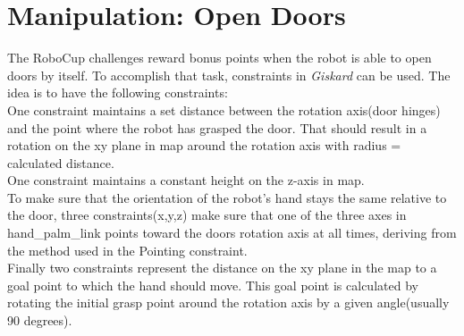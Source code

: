 \documentclass[main.tex]{subfiles}
\begin{document}
		\section{Manipulation: Open Doors}
		The RoboCup challenges reward bonus points when the robot is able to open doors by itself. To accomplish that task, constraints in \textit{Giskard} can be used. The idea is to have the following constraints:\\
		One constraint maintains a set distance between the rotation axis(door hinges) and the point where the robot has grasped the door. That should result in a rotation on the xy plane in map around the rotation axis with radius = calculated distance.\\
		One constraint maintains a constant height on the z-axis in map.\\
		To make sure that the orientation of the robot's hand stays the same relative to the door, three constraints(x,y,z) make sure that one of the three axes in hand\_palm\_link points toward the doors rotation axis at all times, deriving from the method used in the Pointing constraint.\\
		Finally two constraints represent the distance on the xy plane in the map to a goal point to which the hand should move. This goal point is calculated by rotating the initial grasp point around the rotation axis by a given angle(usually 90 degrees).
		
		
		
	\endgroup
\end{document}
